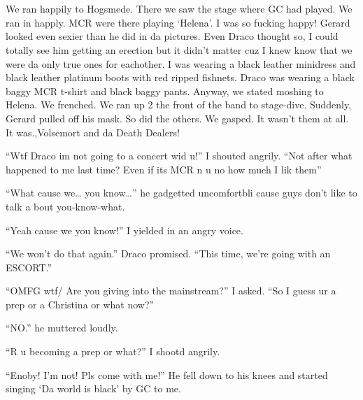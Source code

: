 \section{}



We ran happily to Hogsmede. There we saw the stage where GC had played. We ran in happly. MCR were there playing \enquote*{Helena}. I was so fucking happy! Gerard looked even sexier than he did in da pictures. Even Draco thought so, I could totally see him getting an erection but it didn't matter cuz I knew know that we were da only true ones for eachother. I was wearing a black leather minidress and black leather platinum boots with red ripped fishnets. Draco was wearing a black baggy MCR t-shirt and black baggy pants. Anyway, we stated moshing to Helena. We frenched. We ran up 2 the front of the band to stage-dive. Suddenly, Gerard pulled off his mask. So did the others. We gasped. It wasn't them at all. It was.,\dotfill Volsemort and da Death Dealers!

\enquote{Wtf Draco im not going to a concert wid u!} I shouted angrily. \enquote{Not after what happened to me last time? Even if its MCR n u no how much I lik them}

\begin{sloppypar}
    \enquote{What cause we\ldots{} you know\ldots{}} he gadgetted uncom\-fort\-bli cause guys don't like to talk a bout you-know-what.
\end{sloppypar}

\enquote{Yeah cause we you know!} I yielded in an angry voice.

\enquote{We won't do that again.} Draco promised. \enquote{This time, we're going with an ESCORT\@.}

\enquote{OMFG wtf/ Are you giving into the mainstream?} I asked. \enquote{So I guess ur a prep or a Christina or what now?}

\enquote{NO\@.} he muttered loudly.

\enquote{R u becoming a prep or what?} I shootd angrily.

\enquote{Enoby! I'm not! Pls come with me!} He fell down to his knees and started singing \enquote*{Da world is black} by GC to me.

